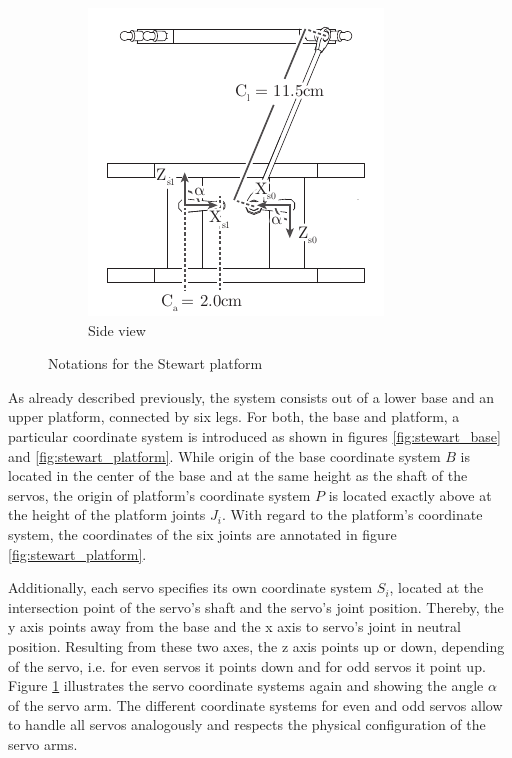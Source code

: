 \begin{figure}
\begin{subfigure}{0.49\textwidth}
		\centering
		\includegraphics{../figures/stewart_side}
		\caption{Side view}
		\label{fig:stewart_side}
	\end{subfigure}
	\caption{Notations for the Stewart platform}
	\label{fig:stewart_notation}
\end{figure}

As already described previously, the system consists out of a lower base and
an upper platform, connected by six legs. For both, the base and platform, a
particular coordinate system is introduced as shown in figures
\ref{fig:stewart_base} and \ref{fig:stewart_platform}. While origin of the
base coordinate system $B$ is located in the center of the base and at the
same height as the shaft of the servos, the origin of platform's coordinate
system $P$ is located exactly above at the height of the platform joints
$J_i$. With regard to the platform's coordinate system, the coordinates of the
six joints are annotated in figure \ref{fig:stewart_platform}.

Additionally, each servo specifies its own coordinate system $S_i$, located at
the intersection point of the servo's shaft and the servo's joint position.
Thereby, the y axis points away from the base and the x axis to servo's joint
in neutral position. Resulting from these two axes, the z axis points up or
down, depending of the servo, i.e. for even servos it points down and for odd
servos it point up. Figure \ref{fig:stewart_side} illustrates the servo
coordinate systems again and showing the angle $\alpha$ of the servo arm. The
different coordinate systems for even and odd servos allow to handle all
servos analogously and respects the physical configuration of the servo arms.

